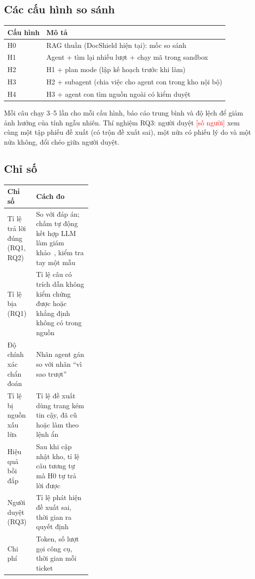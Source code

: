 \documentclass[11pt,a4paper]{article}
\newcommand{\dien}[1]{\textcolor{red}{[#1]}}
\begin{document}
\subsection{Các cấu hình so sánh}
\begin{tabularx}{\linewidth}{@{}lY@{}}
\toprule
\textbf{Cấu hình} & \textbf{Mô tả} \\
\midrule
H0 & RAG thuần (DocShield hiện tại): mốc so sánh \\
H1 & Agent + tìm lại nhiều lượt + chạy mã trong sandbox \\
H2 & H1 + plan mode (lập kế hoạch trước khi làm) \\
H3 & H2 + subagent (chia việc cho agent con trong kho nội bộ) \\
H4 & H3 + agent con tìm nguồn ngoài có kiểm duyệt \\
\bottomrule
\end{tabularx}

Mỗi câu chạy 3--5 lần cho mỗi cấu hình, báo cáo trung bình và độ lệch để giảm ảnh hưởng của tính ngẫu
nhiên. Thí nghiệm RQ3: người duyệt \dien{số người} xem cùng một tập phiếu đề xuất (có trộn đề xuất sai), một
nửa có phiếu lý do và một nửa không, đổi chéo giữa người duyệt.

\subsection{Chỉ số}
\begin{tabularx}{\linewidth}{@{}>{\raggedright\arraybackslash}p{0.34\linewidth}Y@{}}
\toprule
\textbf{Chỉ số} & \textbf{Cách đo} \\
\midrule
Tỉ lệ trả lời đúng (RQ1, RQ2) & So với đáp án; chấm tự động kết hợp LLM làm giám khảo~\cite{llmjudge}, kiểm tra tay một mẫu \\
Tỉ lệ bịa (RQ1) & Tỉ lệ câu có trích dẫn không kiểm chứng được hoặc khẳng định không có trong nguồn \\
Độ chính xác chẩn đoán & Nhãn agent gán so với nhãn ``vì sao trượt'' \\
Tỉ lệ bị nguồn xấu lừa & Tỉ lệ đề xuất dùng trang kém tin cậy, đã cũ hoặc làm theo lệnh ẩn \\
Hiệu quả bồi đắp & Sau khi cập nhật kho, tỉ lệ câu tương tự mà H0 tự trả lời được \\
Người duyệt (RQ3) & Tỉ lệ phát hiện đề xuất sai, thời gian ra quyết định \\
Chi phí & Token, số lượt gọi công cụ, thời gian mỗi ticket \\
\bottomrule
\end{tabularx}
\end{document}
